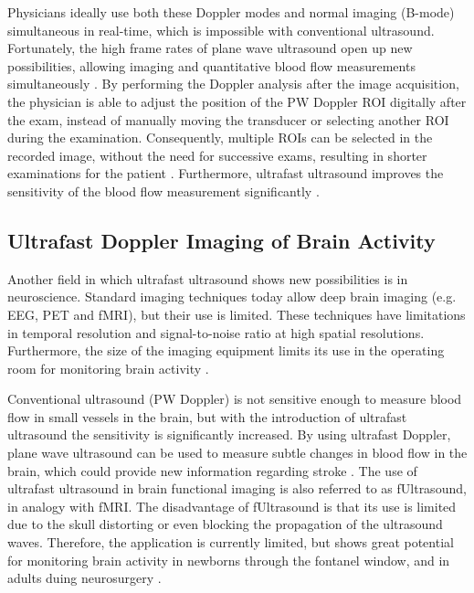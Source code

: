 Physicians ideally use both these Doppler modes and normal imaging (B-mode) simultaneous in real-time, which is impossible with conventional ultrasound. Fortunately, the high frame rates of plane wave ultrasound open up new possibilities, allowing imaging and quantitative blood flow measurements simultaneously \cite{minin_ultrafast_2011}. By performing the Doppler analysis after the image acquisition, the physician is able to adjust the position of the PW Doppler ROI digitally after the exam, instead of manually moving the transducer or selecting another ROI during the examination. Consequently, multiple ROIs can be selected in the recorded image, without the need for successive exams, resulting in shorter examinations for the patient \cite{tanter_ultrafast_2014}. Furthermore, ultrafast ultrasound improves the sensitivity of the blood flow measurement significantly \cite{minin_ultrafast_2011}. 



\subsection{Ultrafast Doppler Imaging of Brain Activity}
Another field in which ultrafast ultrasound shows new possibilities is in neuroscience. Standard imaging techniques today allow deep brain imaging (e.g. EEG, PET and fMRI), but their use is limited. These techniques have limitations in temporal resolution and signal-to-noise ratio at high spatial resolutions. Furthermore, the size of the imaging equipment limits its use in the operating room for monitoring brain activity \cite{tanter_ultrafast_2014}. 

Conventional ultrasound (PW Doppler) is not sensitive enough to measure blood flow in small vessels in the brain, but with the introduction of ultrafast ultrasound the sensitivity is significantly increased. By using ultrafast Doppler, plane wave ultrasound can be used to measure subtle changes in blood flow in the brain, which could provide new information regarding stroke \cite{tanter_ultrafast_2014}. The use of ultrafast ultrasound in brain functional imaging is also referred to as fUltrasound, in analogy with fMRI. The disadvantage of fUltrasound is that its use is limited due to the skull distorting or even blocking the propagation of the ultrasound waves. Therefore, the application is currently limited, but shows great potential for monitoring brain activity in newborns through the fontanel window, and in adults duing neurosurgery \cite{tanter_ultrafast_2014}. 





